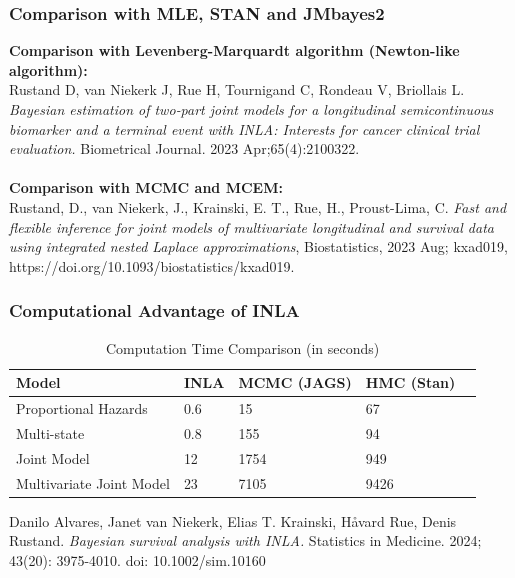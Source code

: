 \documentclass[11pt,
compress,
]{beamer}
\begin{document}
\begin{frame}[fragile]
	\frametitle{Comparison with MLE, STAN and JMbayes2}
	\vspace{-1cm}
	\small
	\textbf{Comparison with Levenberg-Marquardt algorithm (Newton-like algorithm):}\\
	{\color{purple}  Rustand D, van Niekerk J, Rue H, Tournigand C, Rondeau V, Briollais L. \textit{Bayesian estimation of two‐part joint models for a longitudinal semicontinuous biomarker and a terminal event with INLA: Interests for cancer clinical trial evaluation.} Biometrical Journal. 2023 Apr;65(4):2100322.}\\ \ \\
	
	\textbf{Comparison with MCMC and MCEM:}\\
	{\color{purple}  Rustand, D., van Niekerk, J., Krainski, E. T., Rue, H., Proust-Lima, C. \textit{Fast and flexible inference for joint models of multivariate longitudinal and survival data using integrated nested Laplace approximations}, Biostatistics, 2023 Aug; kxad019, https://doi.org/10.1093/biostatistics/kxad019.}\\
\end{frame}

\begin{frame}[fragile]
	\frametitle{Computational Advantage of INLA}
	\vspace{-1cm}
	\begin{table}[h!]
		\centering
		\caption*{Computation Time Comparison (in seconds)}
		\label{tab:computation_time}
		\begin{tabularx}{\textwidth}{|l|X|X|X|X|}
			\hline
			\textbf{Model} & \textbf{INLA} & \textbf{MCMC (JAGS)} & \textbf{HMC (Stan)}\\
			\hline
			Proportional Hazards & 0.6 & 15 & 67\\
			\hline
			Multi-state & 0.8 & 155 & 94\\
			\hline
			Joint Model & 12 & 1754 & 949\\
			\hline
			Multivariate Joint Model & 23 & 7105 & 9426\\
			\hline
		\end{tabularx}
	\end{table}
	\begin{minipage}[t]{\textwidth}
		\linespread{0.8}\selectfont
		\footnotesize {\color{purple}  Danilo Alvares, Janet van Niekerk, Elias T. Krainski, H\aa vard Rue, Denis Rustand. \textit{Bayesian survival analysis with INLA.} Statistics in Medicine. 2024; 43(20): 3975-4010. doi: 10.1002/sim.10160}
	\end{minipage}
\end{frame}
\end{document}
